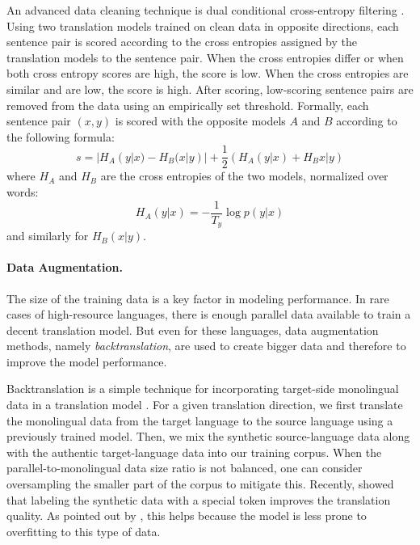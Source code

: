 An advanced data cleaning technique is dual conditional cross-entropy filtering
\citep{junczys-dowmunt-2018-dual}. Using two translation models trained on
clean data in opposite directions, each sentence pair is scored according to
the cross entropies assigned by the translation models to the sentence
pair. When the cross entropies differ or when both cross entropy scores are
high, the score is low. When the cross entropies are similar and are low, the
score is high. After scoring, low-scoring sentence pairs are removed from the
data using an empirically set threshold. Formally, each sentence pair $(x,y)$
is scored with the opposite models $A$ and $B$ according to the following
formula:
%
\begin{equation}
  s = |H_A(y|x) - H_B(x|y)| + \frac{1}{2} (H_A(y|x) + H_B{x|y})
\end{equation}
where $H_A$ and $H_B$ are the cross entropies of the two models, normalized
over words:
%
\begin{equation}
  H_A(y|x) = - \frac{1}{T_y} \log p(y|x)
\end{equation}
and similarly for $H_B(x|y)$.

\paragraph{Data Augmentation.} The size of the training data is a key factor in
modeling performance. In rare cases of high-resource languages, there is enough
parallel data available to train a decent translation model. But even for these
languages, data augmentation methods, namely \emph{backtranslation}, are used
to create bigger data and therefore to improve the model performance.

Backtranslation is a simple technique for incorporating target-side monolingual
data in a translation model
\citep{bojar-tamchyna-2011-improving,sennrich-etal-2016-improving}. For a given
translation direction, we first translate the monolingual data from the target
language to the source language using a previously trained model. Then, we mix
the synthetic source-language data along with the authentic target-language
data into our training corpus. When the parallel-to-monolingual data size ratio
is not balanced, one can consider oversampling the smaller part of the corpus
to mitigate this. Recently, \citet{caswell-etal-2019-tagged} showed that
labeling the synthetic data with a special token improves the translation
quality. As pointed out by \citet{marie-etal-2020-tagged}, this helps because
the model is less prone to overfitting to this type of data.

